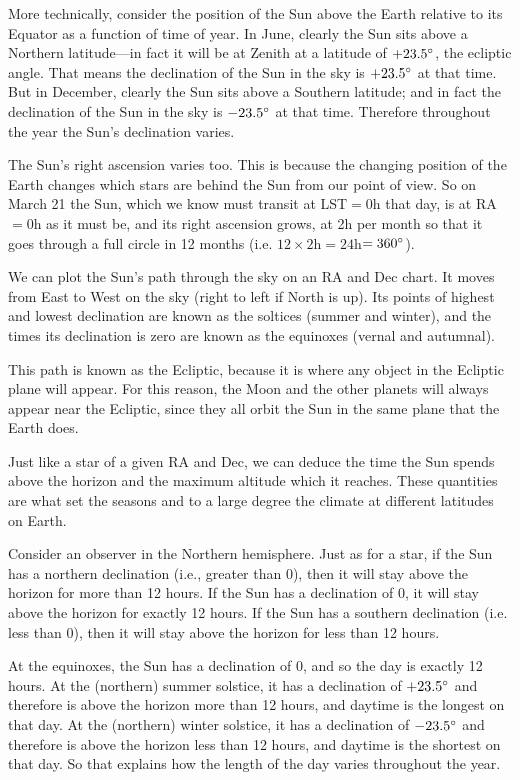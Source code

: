 \documentclass[12pt, preprint]{aastex}
\begin{document}
More technically, consider the position of the Sun above the Earth
relative to its Equator as a function of time of year. In June,
clearly the Sun sits above a Northern latitude---in fact it will be at
Zenith at a latitude of $+23.5{}^\circ$, the ecliptic angle. That means
the declination of the Sun in the sky is $+23.5{}^\circ$ at that time.
But in December, clearly the Sun sits above a Southern latitude; and
in fact the declination of the Sun in the sky is $-23.5{}^\circ$ at
that time. Therefore throughout the year the Sun's declination varies.

The Sun's right ascension varies too. This is because the changing
position of the Earth changes which stars are behind the Sun from our
point of view. So on March 21 the Sun, which we know must transit at
LST$=$0h that day, is at RA$=$0h as it must be, and its right
ascension grows, at 2h per month so that it goes through a full circle
in 12 months (i.e. $12\times 2$h$=24$h$=360{}^\circ$).

We can plot the Sun's path through the sky on an RA and Dec chart. It
moves from East to West on the sky (right to left if North is up). Its
points of highest and lowest declination are known as the soltices
(summer and winter), and the times its declination is zero are known
as the equinoxes (vernal and autumnal).

This path is known as the Ecliptic, because it is where any object in
the Ecliptic plane will appear. For this reason, the Moon and the
other planets will always appear near the Ecliptic, since they all
orbit the Sun in the same plane that the Earth does.

Just like a star of a given RA and Dec, we can deduce the time the Sun
spends above the horizon and the maximum altitude which it
reaches. These quantities are what set the seasons and to a large
degree the climate at different latitudes on Earth. 

Consider an observer in the Northern hemisphere. Just as for a star,
if the Sun has a northern declination (i.e., greater than 0\degree),
then it will stay above the horizon for more than 12 hours. If the Sun
has a declination of 0\degree, it will stay above the horizon for
exactly 12 hours. If the Sun has a southern declination (i.e. less
than 0\degree), then it will stay above the horizon for less than 12
hours.

At the equinoxes, the Sun has a declination of 0\degree, and so the
day is exactly 12 hours. At the (northern) summer solstice, it has a
declination of $+23.5{}^\circ$ and therefore is above the horizon more
than 12 hours, and daytime is the longest on that day. At the
(northern) winter solstice, it has a declination of $-23.5{}^\circ$ and
therefore is above the horizon less than 12 hours, and daytime is the
shortest on that day. So that explains how the length of the day
varies throughout the year.
\end{document}
